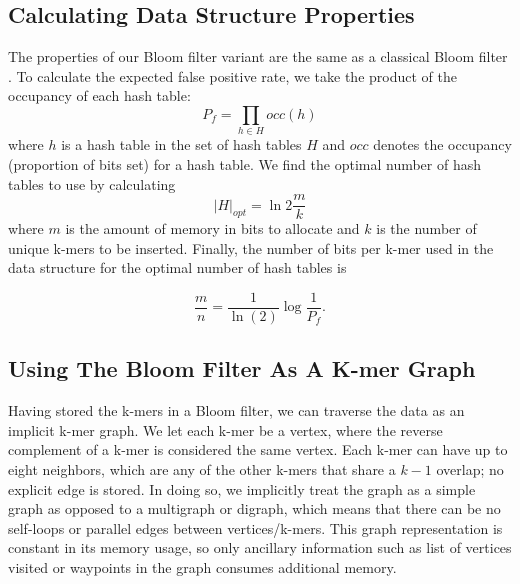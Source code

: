 \documentclass[12pt]{article} \usepackage{simplemargins}
\begin{document}
\subsection{Calculating Data Structure Properties}
The properties of our Bloom filter variant are the
same as a classical Bloom filter \cite{bloomsurvey}.
To calculate the expected false positive 
rate, we
take the product of the occupancy of each hash table:
\begin{displaymath}
P_f = \prod_{h \in H} occ(h)
\end{displaymath}
where $h$ is a hash table in the set of hash tables $H$ and $occ$ denotes
the occupancy (proportion of bits set) for a hash table.
We find the optimal number of hash tables
to use by calculating
\begin{displaymath}
\vert H \vert_{opt} = \ln 2 \frac{m}{k}
\end{displaymath}
where $m$ is the amount of memory in bits to allocate and $k$
is the number of unique k-mers to be inserted. Finally,
the number of bits per
k-mer used in the data structure for the optimal number of hash 
tables is

\begin{displaymath}
\frac{m}{n} = \frac{1}{\ln(2)} \log{\frac{1}{P_f}}.
\end{displaymath}

\begin{table}
\caption{The number of bits needed to store each k-mer for selected
false positive rates.  These numbers are independent of the specific k
chosen.}
\end{table}

\subsection{Using The Bloom Filter As A K-mer Graph}
Having stored the k-mers in a Bloom filter, we can traverse
the data as an implicit k-mer graph. We let each k-mer be a vertex, where
the reverse complement of a k-mer is considered the same
vertex. Each k-mer can
have up to eight neighbors, which are any of the other k-mers that
 share a $k-1$
overlap; no explicit edge is stored. In doing so, we implicitly 
treat the graph as a simple graph as opposed to a multigraph or 
digraph, which means that there can be no self-loops or parallel 
edges between vertices/k-mers. This graph representation is constant 
in its memory usage, so only ancillary information such as list 
of vertices visited or waypoints in the graph consumes additional 
memory.
\end{document}
